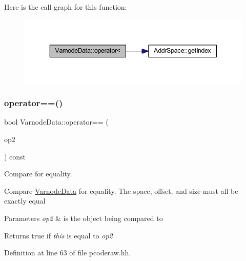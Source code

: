 Here is the call graph for this function\+:
\nopagebreak
\begin{figure}[H]
\begin{center}
\leavevmode
\includegraphics[width=343pt]{struct_varnode_data_ac453e3030db573d022069a80e09ea485_cgraph}
\end{center}
\end{figure}
\mbox{\label{struct_varnode_data_ae710e3e383ace7e5f939d15bb677c054}} 
\subsubsection{\texorpdfstring{operator==()}{operator==()}}
{\footnotesize\ttfamily bool Varnode\+Data\+::operator== (\begin{DoxyParamCaption}\item[{const \mbox{\hyperlink{struct_varnode_data}{Varnode\+Data}} \&}]{op2 }\end{DoxyParamCaption}) const\hspace{0.3cm}{\ttfamily [inline]}}



Compare for equality. 

Compare \mbox{\hyperlink{struct_varnode_data}{Varnode\+Data}} for equality. The space, offset, and size must all be exactly equal 
\begin{DoxyParams}{Parameters}
{\em op2} & is the object being compared to \\
\hline
\end{DoxyParams}
\begin{DoxyReturn}{Returns}
true if {\itshape this} is equal to {\itshape op2} 
\end{DoxyReturn}


Definition at line 63 of file pcoderaw.\+hh.

\mbox{\label{struct_varnode_data_a20a4c1ccbaa1f2477d036be8be923894}} 
